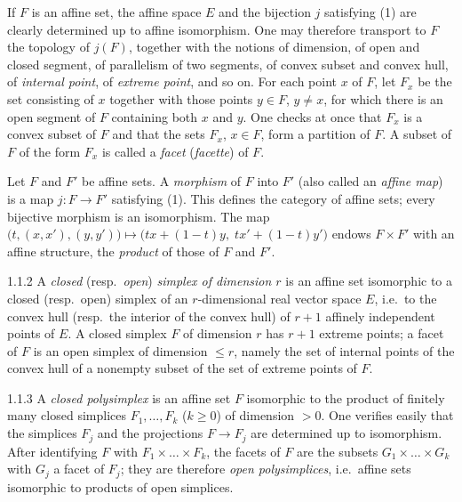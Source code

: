 \documentclass[12pt,a4paper,oneside,english]{smfart}
\makeatletter
\newcommand{\btanchor}[1]{\leavevmode\Hy@raisedlink{\hypertarget{bt:#1}{}}}
\theoremstyle{definition}
\theoremstyle{bt}
\makeatother
\begin{document}
If $F$ is an affine set, the affine space $E$ and the bijection $j$ satisfying (1) are clearly determined up to affine isomorphism. One may therefore transport to $F$ the topology of $j(F)$, together with the notions of dimension, of open and closed segment, of parallelism of two segments, of convex subset and convex hull, of \emph{internal point}, of \emph{extreme point}, and so on. For each point $x$ of $F$, let $F_x$ be the set consisting of $x$ together with those points $y\in F$, $y\neq x$, for which there is an open segment of $F$ containing both $x$ and $y$. One checks at once that $F_x$ is a convex subset of $F$ and that the sets $F_x$, $x\in F$, form a partition of $F$. A subset of $F$ of the form $F_x$ is called a \emph{facet} (\emph{facette}) of $F$.

Let $F$ and $F'$ be affine sets. A \emph{morphism} of $F$ into $F'$ (also called an \emph{affine map}) is a map $j:F\rightarrow F'$ satisfying (1). This defines the category of affine sets; every bijective morphism is an isomorphism. The map $\bigl(t,(x,x'),(y,y')\bigr)\mapsto\bigl(tx+(1-t)y,\;tx'+(1-t)y'\bigr)$ endows $F\times F'$ with an affine structure, the \emph{product} of those of $F$ and $F'$.

\num{1.1.2}\btanchor{1.1.2} A \emph{closed} (resp.\ \emph{open}) \emph{simplex of dimension
$r$} is an affine set isomorphic to a closed (resp.\ open) simplex of an $r$-dimensional real vector space $E$, i.e.\ to the convex hull (resp.\ the interior of the convex hull) of $r+1$ affinely independent points of $E$. A closed simplex $F$ of dimension $r$ has $r+1$ extreme points; a facet of $F$ is an open simplex of dimension $\leqslant r$, namely the set of internal points of the convex hull of a nonempty subset of the set of extreme points of $F$.

\num{1.1.3}\btanchor{1.1.3} A \emph{closed polysimplex} is an affine set $F$ isomorphic to the
product of finitely many closed simplices $F_1,\dots,F_k$ ($k\geqslant0$) of dimension $>0$. One verifies easily that the simplices $F_j$ and the projections $F\rightarrow F_j$ are determined up to isomorphism. After identifying $F$ with $F_1\times\dots\times F_k$, the facets of $F$ are the subsets $G_1\times\dots\times G_k$ with $G_j$ a facet of $F_j$; they are therefore \emph{open polysimplices}, i.e.\ affine sets isomorphic to products of open simplices.
\end{document}
